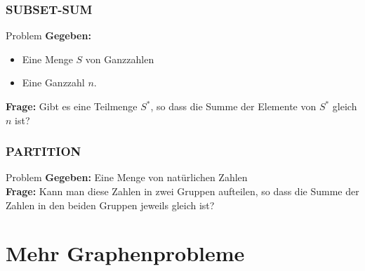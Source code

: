\begin{frame}
\frametitle{SUBSET-SUM}
\begin{block}{Problem}
\textbf{Gegeben:}
\begin{itemize}
 \item Eine Menge $S$ von Ganzzahlen
 \item Eine Ganzzahl $n$.
\end{itemize}
\textbf{Frage:}
Gibt es eine Teilmenge $S^*$, so dass die Summe der Elemente von $S^*$ gleich $n$ ist?
\end{block}
\end{frame}
\begin{frame}
\frametitle{PARTITION}
\begin{block}{Problem}
\textbf{Gegeben:} Eine Menge von natürlichen Zahlen\\
\textbf{Frage:} Kann man diese Zahlen in zwei Gruppen aufteilen, so dass die Summe der Zahlen in den beiden Gruppen jeweils gleich ist?
\end{block}
\end{frame}


\section{Mehr Graphenprobleme}
\subsection{}

